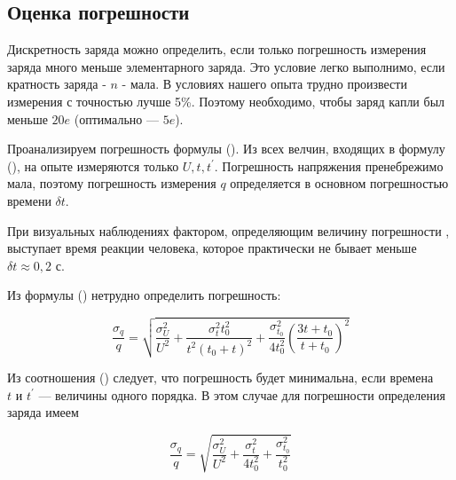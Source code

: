 \documentclass{lab}
\begin{document}
\subsection*{Оценка погрешности}

Дискретность заряда можно определить, если только погрешность измерения заряда много меньше элементарного заряда. Это условие легко выполнимо, если кратность заряда - $n$ - мала. В условиях нашего опыта трудно произвести измерения с точностью лучше 5\%. Поэтому необходимо, чтобы заряд капли был меньше $20e$ (оптимально — $5e$).

Проанализируем погрешность формулы (). Из всех велчин, входящих в формулу (), на опыте измеряются только $U, t, t^{'}$. Погрешность напряжения пренебрежимо мала, поэтому погрешность измерения $q$  определяется в основном погрешностью времени $\delta t$.

При визуальных наблюдениях фактором, определяющим величину погрешности , выступает время реакции человека, которое практически не бывает меньше $\delta t \approx 0,2$ с.

Из формулы () нетрудно определить погрешность:

\begin{equation}
    \frac{\sigma_q}{q} = \sqrt{{\frac{\sigma^2_{U}}{U^{2}} + \frac{\sigma^2_{t} t_{0}^{2}}{t^{2} (t_{0}+t)^{2}}} + \frac{\sigma^2_{t_0}}{4t_{0}^{2}} \left(\frac{3 t + t_{0}}{t + t_{0}}\right)^{2}}
    \label{eq:q_deviation}
\end{equation}

Из соотношения () следует, что погрешность будет минимальна, если
времена $t \text{ и } t^{'}$ — величины одного порядка. В этом случае для
погрешности определения заряда имеем

\begin{equation}
    \frac{\sigma_q}{q} = \sqrt{\frac{\sigma^2_{U}}{U^{2}} + \frac{\sigma^2_{t}}{4t_{0}^{2}} + \frac{\sigma^2_{t_0}}{t_{0}^{2}}}
    \label{eq:q_deviation_final}
\end{equation}

\newpage
\end{document}
